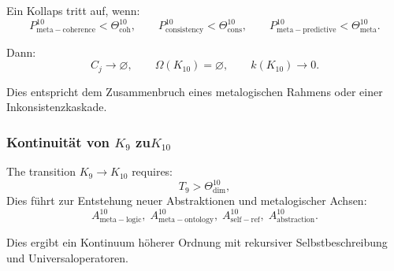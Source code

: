 Ein Kollaps tritt auf, wenn:
\[
  P^{10}_{\mathrm{meta\!-\!coherence}} < \Theta^{10}_{\mathrm{coh}},\qquad
  P^{10}_{\mathrm{consistency}} < \Theta^{10}_{\mathrm{cons}},\qquad
  P^{10}_{\mathrm{meta\!-\!predictive}} < \Theta^{10}_{\mathrm{meta}}.
\]

Dann:
\[
  C_j \to \varnothing,\qquad
  \Omega(K_{10})=\varnothing,\qquad
  k(K_{10})\to 0.
\]

Dies entspricht dem Zusammenbruch eines metalogischen Rahmens oder einer
Inkonsistenzkaskade.


\subsubsection{Kontinuität von \texorpdfstring{$K_9$}{K_9} zu$K_{10}$}

The transition $K_9\to K_{10}$ requires:
\[
  T_9 > \Theta^{10}_{\mathrm{dim}},
\]
Dies führt zur Entstehung neuer Abstraktionen und metalogischer Achsen:
\[
  A^{10}_{\mathrm{meta\!-\!logic}},\;
  A^{10}_{\mathrm{meta\!-\!ontology}},\;
  A^{10}_{\mathrm{self\!-\!ref}},\;
  A^{10}_{\mathrm{abstraction}}.
\]

Dies ergibt ein Kontinuum höherer Ordnung mit rekursiver Selbstbeschreibung und
Universaloperatoren.
